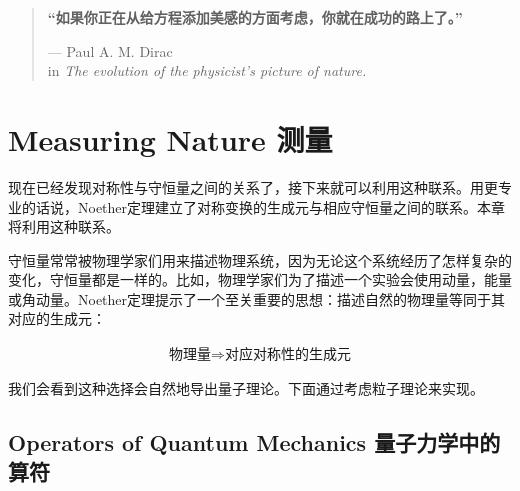 


\begin{quote}%
{\bf “如果你正在从给方程添加美感的方面考虑，你就在成功的路上了。”}


\begin{flushright}
--- Paul A. M. Dirac\\
in {\it The evolution of the
physicist's picture of nature.}
\end{flushright}
\end{quote}

\chapter[测量]{Measuring Nature 测量}\label{chap5}

现在已经发现对称性与守恒量之间的关系了，接下来就可以利用这种联系。用更专业的话说，Noether定理建立了对称变换的生成元与相应守恒量之间的联系。本章将利用这种联系。

守恒量常常被物理学家们用来描述物理系统，因为无论这个系统经历了怎样复杂的变化，守恒量都是一样的。比如，物理学家们为了描述一个实验会使用动量，能量或角动量。Noether定理提示了一个至关重要的思想：描述自然的物理量等同于其对应的生成元：

\begin{align}\label{equ5.1}
\text{物理量}\Rightarrow\text{对应对称性的生成元}
\end{align}

我们会看到这种选择会自然地导出量子理论。下面通过考虑粒子理论来实现。

\section[量子力学中的算符]{Operators of Quantum Mechanics 量子力学中的算符}\label{sec5.1}

